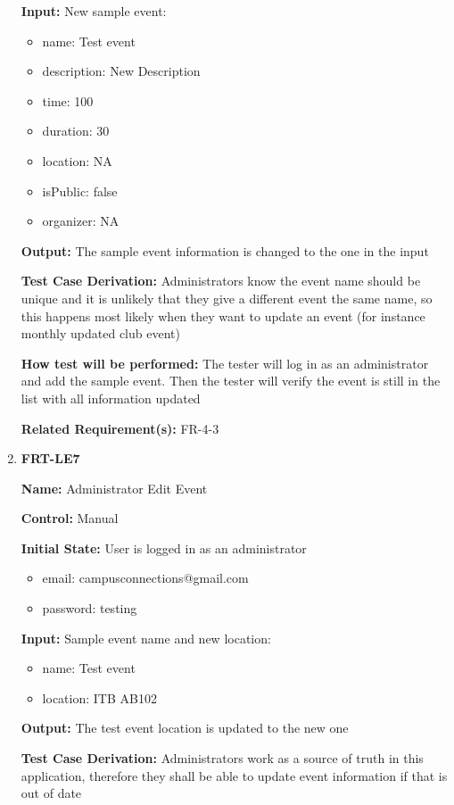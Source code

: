 \documentclass[12pt, titlepage]{article}
\begin{document}
\begin{enumerate}
\textbf{Input:} New sample event:
\begin{itemize}
\item name: Test event
\item description: New Description
\item time: 100
\item duration: 30
\item location: NA
\item isPublic: false
\item organizer: NA
\end{itemize}
					
\textbf{Output:} The sample event information is changed to the one in the input

\textbf{Test Case Derivation:} Administrators know the event name should be unique and it is unlikely that they give a different event the same name, so this happens most likely when they want to update an event (for instance monthly updated club event)
					
\textbf{How test will be performed:} The tester will log in as an administrator and add the sample event. Then the tester will verify the event is still in the list with all information updated

\textbf{Related Requirement(s):} FR-4-3

\item{\textbf{FRT-LE7}}

\textbf{Name:} Administrator Edit Event

\textbf{Control:} Manual
					
\textbf{Initial State:} User is logged in as an administrator
\begin{itemize}
\item email: campusconnections@gmail.com
\item password: testing
\end{itemize}

\textbf{Input:} Sample event name and new location:
\begin{itemize}
\item name: Test event
\item location: ITB AB102
\end{itemize}
					
\textbf{Output:} The test event location is updated to the new one

\textbf{Test Case Derivation:} Administrators work as a source of truth in this application, therefore they shall be able to update event information if that is out of date
					

\end{enumerate}
\end{document}
